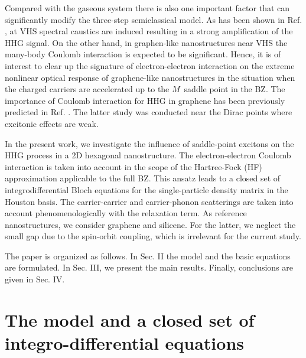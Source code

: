 \documentclass[reprint, superscriptaddress,  aps, pra]{revtex4-2}
\begin{document}
Compared with the gaseous system there is also one important factor that can
significantly modify the three-step semiclassical model. As has been shown
in Ref. \cite{Uzan-Ivanov}, at VHS spectral caustics are induced resulting
in a strong amplification of the HHG signal. On the other hand, in
graphen-like nanostructures near VHS the many-body Coulomb interaction is
expected to be significant. Hence, it is of interest to clear up the
signature of electron-electron interaction on the extreme nonlinear optical
response of graphene-like nanostructures in the situation when the charged
carriers are accelerated up to the $M$\ saddle point in the BZ. The
importance of Coulomb interaction for HHG in graphene has been previously
predicted in Ref. \cite{Mer18}. The latter study was conducted near the
Dirac points where excitonic effects are weak.

In the present work, we investigate the influence of saddle-point excitons
on the HHG process in a 2D hexagonal nanostructure. The electron-electron
Coulomb interaction is taken into account in the scope of the Hartree-Fock
(HF) approximation applicable to the full BZ. This ansatz leads to a closed
set of integrodifferential Bloch equations for the single-particle density
matrix in the Houston basis. The carrier-carrier and carrier-phonon
scatterings are taken into account phenomenologically with the relaxation
term. As reference nanostructures, we consider graphene and silicene. For
the latter, we neglect the small gap due to the spin-orbit coupling, which
is irrelevant for the current study.

The paper is organized as follows. In Sec. II the model and the basic
equations are formulated. In Sec. III, we present the main results. Finally,
conclusions are given in Sec. IV.

\section{The model and a closed set of integro-differential equations}
\end{document}
